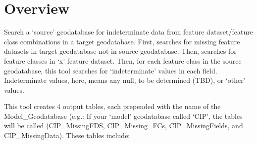 \documentclass[openany]{book}
\theoremstyle{definition}
\theoremstyle{definition}
\theoremstyle{definition}
\theoremstyle{remark}
\begin{document}
\section{Overview}\label{overview-9}

Search a `source' geodatabase for indeterminate data from feature
dataset/feature class combinations in a target geodatabase. First,
searches for missing feature datasets in target geodatabase not in
source geodatabase. Then, searches for feature classes in `x' feature
dataset. Then, for each feature class in the source geodatabase, this
tool searches for `indeterminate' values in each field. Indeterminate
values, here, means any null, to be determined (TBD), or `other' values.

This tool creates 4 output tables, each prepended with the name of the
Model\_Geodatabase (e.g.: If your `model' geodatabase called `CIP', the
tables will be called (CIP\_MissingFDS, CIP\_Missing\_FCs,
CIP\_MissingFields, and CIP\_MissingData). These tables include:
\end{document}
